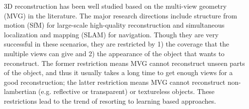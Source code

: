 \documentclass[runningheads]{llncs}
\begin{document}
3D reconstruction has been well studied based on the multi-view geometry (MVG) \cite{Multiview04} in the literature. The major research directions include structure from motion (SfM) \cite{SchonbergerF16} for large-scale high-quality reconstruction and simultaneous localization and mapping (SLAM) \cite{CadenaCCLSNRL16} for navigation. Though they are very successful in these scenarios, they are restricted by 1) the coverage that the multiple views can give and 2) the appearance of the object that wants to reconstruct. The former restriction means MVG cannot reconstruct unseen parts of the object, and thus it usually takes a long time to get enough views for a good reconstruction; the latter restriction means MVG cannot reconstruct non-lambertian (e.g. reflective or transparent) or textureless objects. These restrictions lead to the trend of resorting to learning based approaches.
\end{document}
